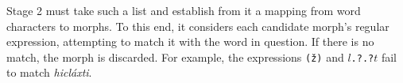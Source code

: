 Stage 2 must take such a list and establish from it a mapping from word characters to morphs. To this end, it considers each candidate morph's regular expression, attempting to match it with the word in question. If there is no match, the morph is discarded. For example, the expressions \texttt{(\v{z})} and \texttt{\(l\).?.?\(t\)} fail to match \textit{hicl\'{a}xti}. 


